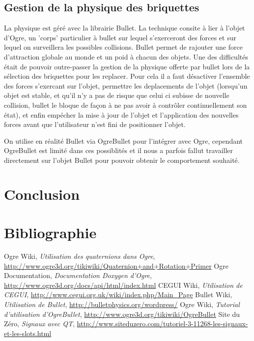 \documentclass[frenchb,twoside]{EPURapport}
\begin{document}
    \section{Gestion de la physique des briquettes}
        La physique est géré avec la librairie Bullet. La technique consite à
        lier à l'objet d'Ogre, un 'corps' particulier à bullet sur lequel
        s'exerceront des forces et sur lequel on surveillera les possibles
        collisions. Bullet permet de rajouter une force d'attraction globale au
        monde et un poid à chacun des objets. Une des difficultés était de
        pouvoir outre-passer la gestion de la physique offerte par bullet lors
        de la sélection des briquettes pour les replacer. Pour cela il a faut
        désactiver l'ensemble des forces s'exercant sur l'objet, permettre les
        deplacements de l'objet (lorsqu'un objet est stable, et qu'il n'y a pas
        de risque que celui ci subisse de nouvelle collision, bullet le bloque
        de façon à ne pas avoir à contrôler continuellement son état), et enfin
        empécher la mise à jour de l'objet et l'application des nouvelles
        forces avant que l'utilisateur n'est fini de positionner l'objet. 

        On utilise en réalité Bullet via OgreBullet pour l'intégrer avec Ogre,
        cependant OgreBullet est limité dans ces possiblités et il nous a
        parfois fallut travailler directement sur l'objet Bullet pour pouvoir
        obtenir le comportement souhaité.


\chapter{Conclusion}




\chapter{Bibliographie}

\begin{bibliographie}	
	 Ogre Wiki, \textit{Utilisation des quaternions dans Ogre}, \url{http://www.ogre3d.org/tikiwiki/Quaternion+and+Rotation+Primer}
	 Ogre Documentation, \textit{Documentation Doxygen d'Ogre}, \url{http://www.ogre3d.org/docs/api/html/index.html}
	 CEGUI Wiki, \textit{Utilisation de CEGUI}, \url{http://www.cegui.org.uk/wiki/index.php/Main_Page}
	 Bullet Wiki, \textit{Utilisation de Bullet}, \url{http://bulletphysics.org/wordpress/}
	 Ogre Wiki, \textit{Tutorial d'utilisation d'OgreBullet}, \url{http://www.ogre3d.org/tikiwiki/OgreBullet}
	 Site du Zéro, \textit{Signaux avec QT}, \url{http://www.siteduzero.com/tutoriel-3-11268-les-signaux-et-les-slots.html}
	\end{bibliographie}	
\end{document}
